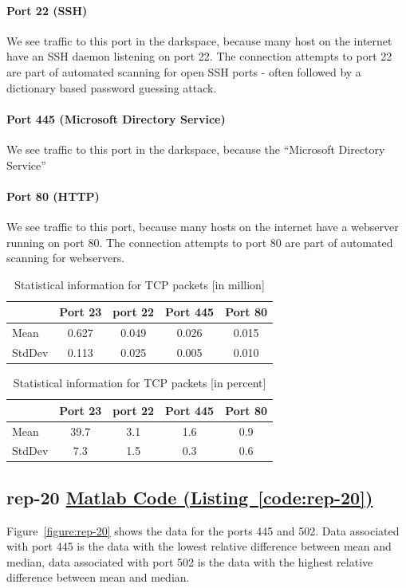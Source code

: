 \documentclass{article}
\newcommand{\codelink}[1]{%
    \hyperref[#1]{\quad\faArrowCircleRight\enskip Matlab Code (Listing~\ref{#1})}%
}
\begin{document}
\paragraph{Port 22 (SSH)}
We see traffic to this port in the darkspace, because many host on the internet have an
SSH daemon listening on port 22. The connection attempts to port 22 are part of automated scanning
for open SSH ports - often followed by a dictionary based password guessing attack.

\paragraph{Port 445 (Microsoft Directory Service)}
We see traffic to this port in the darkspace, because the ``Microsoft Directory Service'' 

\paragraph{Port 80 (HTTP)}
We see traffic to this port, because many hosts on the internet have a webserver running
on port 80. The connection attempts to port 80 are part of automated scanning for webservers.

\begin{table}[H]
    \centering
    \begin{tabular}{l|cccc}
        & Port 23 & port 22 & Port  445 & Port 80 \\
        \hline
        Mean &  0.627 & 0.049 & 0.026 & 0.015 \\
        StdDev &  0.113 & 0.025 & 0.005 & 0.010 \\
    \end{tabular}
    \caption{\label{table:rep-19-absolute} Statistical information for TCP packets [in million]}
\end{table}

\begin{table}[H]
    \centering
    \begin{tabular}{l|cccc}
        & Port 23 & port 22 & Port  445 & Port 80 \\
        \hline
        Mean &   39.7 & 3.1 & 1.6 & 0.9  \\
        StdDev & 7.3  & 1.5 & 0.3 & 0.6   \\
    \end{tabular}
    \caption{\label{table:rep-19-percentage} Statistical information for TCP packets [in percent]}
\end{table}

\subsection{rep-20 \codelink{code:rep-20}}
Figure~\ref{figure:rep-20} shows the data for the ports 445 and 502. Data associated with port 445 is
the data with the lowest relative difference between mean and median, data associated with port 502 is
the data with the highest relative difference between mean and median.
\end{document}
